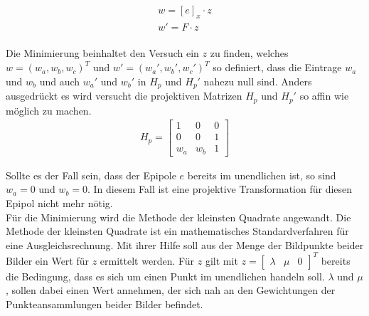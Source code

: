 
\begin{gather}
	w = [e]_x \cdot z \label{eq:w}\\ 
	w'= F\cdot z \label{eq:w'}
\end{gather}\\


Die Minimierung beinhaltet den Versuch ein $z$ zu finden, welches $w = (w_a,w_b,w_c)^T$ und $w'=(w_a',w_b',w_c')^T$ so definiert, dass die Eintrage $w_a$ und $w_b$ und auch $w_a'$ und $w_b'$ in $H_p$ und $H_p'$ nahezu null sind. Anders ausgedrückt es wird versucht die projektiven Matrizen $H_p$ und $H_p'$ so affin wie möglich zu machen\cite{ZZ}.\\ 


\begin{gather}
	H_p = 	\begin{bmatrix}
		1&0&0\\
		0&0&1\\
		w_a&w_b&1
	\end{bmatrix}
\end{gather}


Sollte es der Fall sein, dass der Epipole $e$ bereits im unendlichen ist, so sind $w_a = 0$ und $w_b = 0$. In diesem Fall ist eine projektive Transformation für diesen Epipol nicht mehr nötig.\\

Für die Minimierung wird die Methode der kleinsten Quadrate angewandt. Die Methode der kleinsten Quadrate ist ein mathematisches Standardverfahren für eine Ausgleichsrechnung. Mit ihrer Hilfe soll aus der Menge der Bildpunkte beider Bilder ein Wert für $z$ ermittelt werden\cite{leastSquare}. Für $z$ gilt mit $z = \begin{bmatrix}\lambda&\mu&0\end{bmatrix}^T$ bereits die Bedingung, dass es sich um einen Punkt im unendlichen handeln soll. $\lambda$ und $\mu$, sollen dabei einen Wert annehmen, der sich nah an den Gewichtungen der Punkteansammlungen beider Bilder befindet\cite{ZZ}. \\




